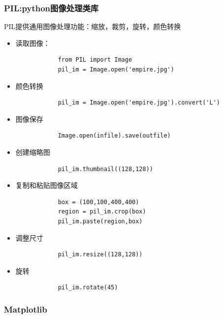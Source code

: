 \documentclass[a4paper,12pt]{article}
\begin{document}
\subsubsection{\color{green}PIL:python图像处理类库}
PIL提供通用图像处理功能：缩放，裁剪，旋转，颜色转换
\begin{itemize}
    \item 读取图像：
            \begin{verbatim}
            from PIL import Image
            pil_im = Image.open('empire.jpg')
            \end{verbatim}
    \item 颜色转换
            \begin{verbatim}
            pil_im = Image.open('empire.jpg').convert('L')
            \end{verbatim}
    \item 图像保存
            \begin{verbatim}
            Image.open(infile).save(outfile)
            \end{verbatim}
    \item 创建缩略图
            \begin{verbatim}
            pil_im.thumbnail((128,128))
            \end{verbatim}
    \item 复制和粘贴图像区域
            \begin{verbatim}
            box = (100,100,400,400)
            region = pil_im.crop(box)
            pil_im.paste(region,box)
            \end{verbatim}
    \item 调整尺寸
            \begin{verbatim}
            pil_im.resize((128,128))
            \end{verbatim}
    \item 旋转
            \begin{verbatim}
            pil_im.rotate(45)
            \end{verbatim}
\end{itemize}

\subsubsection{\color{green}Matplotlib}
\end{document}
